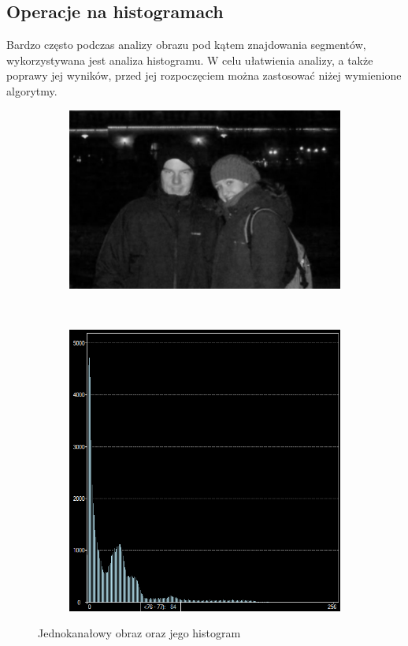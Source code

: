 \subsection{Operacje na histogramach}
Bardzo często podczas analizy obrazu pod kątem znajdowania segmentów, wykorzystywana jest analiza histogramu. W celu ułatwienia analizy, a także poprawy jej wyników, przed jej rozpoczęciem można zastosować niżej wymienione algorytmy.
\begin{figure}
  \centering
  \begin{subfigure}[b]{0.45\textwidth}
    \includegraphics[width=\textwidth]{img/image-histogram}
    \label{fig:image_histogram}
  \end{subfigure}
  ~
  \begin{subfigure}[b]{0.45\textwidth}
    \includegraphics[width=\textwidth]{img/image-histogram-histogram}
    \label{fig:image_histogram_histogram}
  \end{subfigure}
  \caption{Jednokanałowy obraz oraz jego histogram}
  \label{fig:image_histogram_g}
\end{figure}
